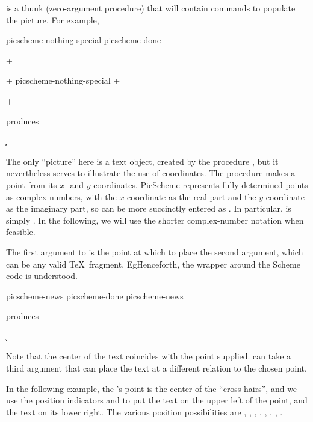 
\n
{} is a thunk (zero-argument procedure) that
will contain commands to populate the picture.
For example,


\verbwritefile picscheme-nothing-special
\verbwritefile picscheme-done

\p+
\centerline{
+
\scminput picscheme-nothing-special
\p+
}
+

\n produces

\quote
\c{ }
\endquote

The only ``picture'' here is a text object, created by
the procedure , but it
nevertheless  serves to illustrate the use of
coordinates.  The procedure  makes a point
from its $x$- and $y$-coordinates.  PicScheme represents
fully determined points as complex numbers, with the $x$-coordinate
as the real part and the $y$-coordinate as the imaginary
part, so  can be more succinctly entered
as .  In particular,  is simply
.  In the following, we will use the shorter
complex-number notation when feasible.

The first argument to  is
the
point at which to place
the second argument, which can be any valid \TeX\
fragment.
Eg\f{Henceforth, the  wrapper around the
Scheme code is understood.}

\verbwritefile picscheme-news
\verbwritefile picscheme-done
\scminput picscheme-news

\n produces

\quote
\c{ }
\endquote


\n Note that the center of the text coincides with the
point supplied.
 can take a third argument that can place
the text at a different relation to the chosen point.

In the following example, the 's point is
the center of the ``cross hairs'', and we use the
position indicators  and 
to put the text  on the upper left of the
point,
and the  text 
on its lower right.
The various position
possibilities are , , ,
, , , , .

